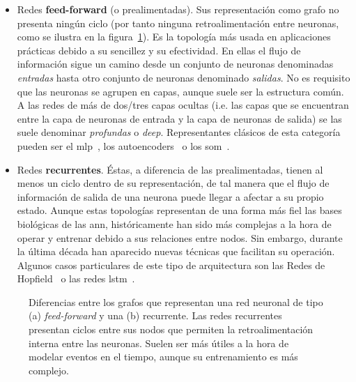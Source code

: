 \begin{itemize}
	\item Redes \textbf{feed-forward} (o prealimentadas). Sus representación como grafo no presenta ningún ciclo (por tanto ninguna retroalimentación entre neuronas, como se ilustra en la figura~\ref{fig:ff-vs-rnn}). Es la topología más usada en aplicaciones prácticas debido a su sencillez y su efectividad. En ellas el flujo de información sigue un camino desde un conjunto de neuronas denominadas \textit{entradas} hasta otro conjunto de neuronas denominado \textit{salidas}. No es requisito que las neuronas se agrupen en capas, aunque suele ser la estructura común. A las redes de más de dos/tres capas ocultas (i.e. las capas que se encuentran entre la capa de neuronas de entrada y la capa de neuronas de salida) se las suele denominar \textit{profundas} o \textit{deep}. Representantes clásicos de esta categoría pueden ser el \gls{mlp}~\cite{rumelhart1985learning}, los autoencoders~\cite{Hinton2006} o los \gls{som}~\cite{kohonen1998self}.
	\item Redes \textbf{recurrentes}. Éstas, a diferencia de las prealimentadas, tienen al menos un ciclo dentro de su representación, de tal manera que el flujo de información de salida de una neurona puede llegar a afectar a su propio estado. Aunque estas topologías representan de una forma más fiel las bases biológicas de las \gls{ann}, históricamente han sido más complejas a la hora de operar y entrenar debido a sus relaciones entre nodos. Sin embargo, durante la última década han aparecido nuevas técnicas que facilitan su operación. Algunos casos particulares de este tipo de arquitectura son las Redes de Hopfield~\cite{hopfield1982neural} o las redes \gls{lstm}~\cite{hochreiter1997long}.
\end{itemize}

\begin{figure}
	\centering
	\qquad
	\caption{Diferencias entre los grafos que representan una red neuronal de tipo (a) \textit{feed-forward} y una (b) recurrente. Las redes recurrentes presentan ciclos entre sus nodos que permiten la retroalimentación interna entre las neuronas. Suelen ser más útiles a la hora de modelar eventos en el tiempo, aunque su entrenamiento es más complejo.}
	\label{fig:ff-vs-rnn}
\end{figure}

